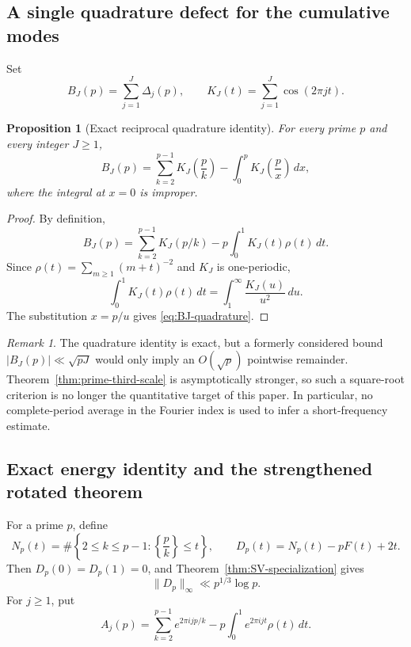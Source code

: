 \documentclass[11pt]{amsart}
\numberwithin{equation}{section}
\newtheorem{proposition}[theorem]{Proposition}
\theoremstyle{definition}
\theoremstyle{remark}
\newtheorem{remark}[theorem]{Remark}
\begin{document}
\subsection{A single quadrature defect for the cumulative modes}

Set
\begin{equation}\label{eq:BJ-def}
 B_J(p)=\sum_{j=1}^J\Delta_j(p),
 \qquad K_J(t)=\sum_{j=1}^J\cos(2\pi jt).
\end{equation}

\begin{proposition}[Exact reciprocal quadrature identity]\label{prop:BJ-quadrature}
For every prime \(p\) and every integer \(J\ge1\),
\begin{equation}\label{eq:BJ-quadrature}
 B_J(p)=\sum_{k=2}^{p-1}K_J\!\left(\frac pk\right)
 -\int_0^pK_J\!\left(\frac px\right)\,dx,
\end{equation}
where the integral at \(x=0\) is improper.
\end{proposition}

\begin{proof}
By definition,
\[
 B_J(p)=\sum_{k=2}^{p-1}K_J(p/k)
 -p\int_0^1K_J(t)\rho(t)\,dt.
\]
Since \(\rho(t)=\sum_{m\ge1}(m+t)^{-2}\) and \(K_J\) is one-periodic,
\[
 \int_0^1K_J(t)\rho(t)\,dt
 =\int_1^\infty\frac{K_J(u)}{u^2}\,du.
\]
The substitution \(x=p/u\) gives \eqref{eq:BJ-quadrature}.
\end{proof}

\begin{remark}\label{rem:BJ-current-role}
The quadrature identity is exact, but a formerly considered bound
\(|B_J(p)|\ll\sqrt{pJ}\) would only imply an \(O(\sqrt p)\) pointwise
remainder.  Theorem~\ref{thm:prime-third-scale} is asymptotically stronger,
so such a square-root criterion is no longer the quantitative target of
this paper.  In particular, no complete-period average in the Fourier index
is used to infer a short-frequency estimate.
\end{remark}

\subsection{Exact energy identity and the strengthened rotated theorem}

For a prime \(p\), define
\begin{equation}\label{eq:Np-Dp}
 N_p(t)=\#\left\{2\le k\le p-1:\left\{\frac pk\right\}\le t\right\},
 \qquad D_p(t)=N_p(t)-pF(t)+2t.
\end{equation}
Then \(D_p(0)=D_p(1)=0\), and
Theorem~\ref{thm:SV-specialization} gives
\begin{equation}\label{eq:Dp-uniform}
 \|D_p\|_\infty\ll p^{1/3}\log p.
\end{equation}
For \(j\ge1\), put
\begin{equation}\label{eq:Aj-def}
 A_j(p)=\sum_{k=2}^{p-1}e^{2\pi i jp/k}
 -p\int_0^1e^{2\pi ijt}\rho(t)\,dt.
\end{equation}
\end{document}
